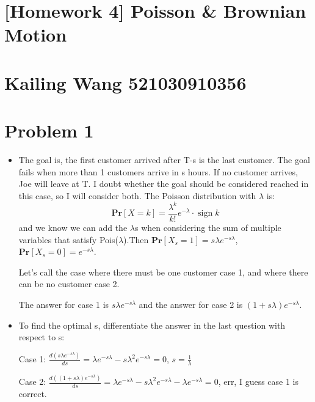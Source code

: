 \documentclass{article}
\theoremstyle{definition}
\begin{document}
	
	\section*{\LARGE [Homework 4] Poisson \& Brownian Motion}
	\section*{\large Kailing Wang 521030910356}
	
	\section*{Problem 1}
	\begin{itemize}
		\item The goal is, the first customer arrived after T-s is the last customer. The goal fails when more than 1 customers arrive in s hours. If no customer arrives, Joe will leave at T. I doubt whether the goal should be considered reached in this case, so I will consider both. The Poisson distribution with $\lambda$ is:
		\begin{equation}
			\mathbf{Pr}[X=k] = \frac{\lambda^k}{k!}e^{-\lambda} \cdot \operatorname{sign}k
		\end{equation}
		and we know we can add the $\lambda$s when considering the sum of multiple variables that satisfy Pois($\lambda$).Then $\mathbf{Pr}[X_s=1] = s\lambda e^{-s\lambda}$, $\mathbf{Pr}[X_s=0] = e^{-s\lambda}$. 
		
		Let's call the case where there must be one customer case 1, and where there can be no customer case 2. 
		
		The answer for case 1 is $s\lambda e^{-s\lambda}$ and the answer for case 2 is $(1+s\lambda)e^{-s\lambda}$.
		\item To find the optimal s, differentiate the answer in the last question with respect to s:
		
		Case 1: $\frac{d(s\lambda e^{-s\lambda})}{d s} = \lambda e^{-s\lambda}-s\lambda^2 e^{-s\lambda} = 0$, $s = \frac{1}{\lambda}$
		
		Case 2: $\frac{d((1+s\lambda) e^{-s\lambda})}{d s} = \lambda e^{-s\lambda}-s\lambda^2 e^{-s\lambda} -\lambda e^{-s\lambda} = 0$, err, I guess case 1 is correct.
	\end{itemize} 
\end{document}
